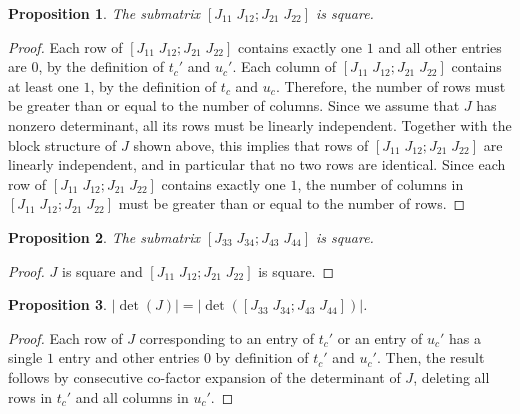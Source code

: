 \documentclass{article}
\newtheorem{prop}{Proposition}
\begin{document}
\begin{prop}
The submatrix $[J_{11} \; J_{12}; J_{21} \; J_{22}]$ is square.
\end{prop}
\begin{proof}
Each row of $[J_{11} \; J_{12}; J_{21} \; J_{22}]$ contains exactly one $1$ and all other entries are $0$, by the definition of $t_c'$ and $u_c'$.
Each column of $[J_{11} \; J_{12}; J_{21} \; J_{22}]$ contains at least one $1$, by the definition of $t_c$ and $u_c$.
Therefore, the number of rows must be greater than or equal to the number of columns.
Since we assume that $J$ has nonzero determinant, all its rows must be linearly independent.
Together with the block structure of $J$ shown above, this implies that rows of $[J_{11} \; J_{12}; J_{21} \; J_{22}]$ are linearly independent, and in particular that no two rows are identical.
Since each row of $[J_{11} \; J_{12}; J_{21} \; J_{22}]$ contains exactly one $1$, the number of columns in $[J_{11} \; J_{12}; J_{21} \; J_{22}]$ must be greater than or equal to the number of rows.
\end{proof}

\begin{prop}
The submatrix $[J_{33} \; J_{34}; J_{43} \; J_{44}]$ is square.
\end{prop}
\begin{proof}
$J$ is square and $[J_{11} \; J_{12}; J_{21} \; J_{22}]$ is square.
\end{proof}

\begin{prop}
$|\det(J)| = |\det([J_{33} \; J_{34}; J_{43} \; J_{44}])|$.
\end{prop}
\begin{proof}
Each row of $J$ corresponding to an entry of $t_c'$ or an entry of $u_c'$ has a single $1$ entry and other entries $0$ by definition of $t_c'$ and $u_c'$.
Then, the result follows by consecutive co-factor expansion of the determinant of $J$, deleting all rows in $t_c'$ and all columns in $u_c'$.
\end{proof}
\end{document}
